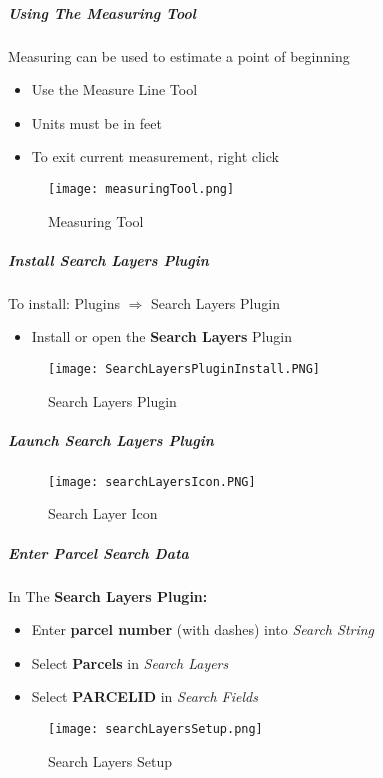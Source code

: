 \subparagraph{Using The Measuring Tool}
\vspace{.3in}

\noindent Measuring can be used to estimate a point of beginning
\begin{itemize}
\item Use the Measure Line Tool
\item Units must be in feet  
\item To exit current measurement, right click
\end{itemize}
\begin{figure}[H]
\centering
    \texttt{[image: measuringTool.png]}
\vspace{-.2in}

\caption{Measuring Tool}
\end{figure}
\clearpage

\subparagraph{Install Search Layers Plugin}
\vspace{.2in}
 
\noindent To install: Plugins $\Rightarrow$ Search Layers Plugin
\vspace{.2in}

\begin{itemize}
\item Install or open the \textbf{Search Layers} Plugin
\end{itemize}
\begin{figure}[H]
\centering
     \texttt{[image: SearchLayersPluginInstall.PNG]}

\caption{Search Layers Plugin}
\end{figure}

\subparagraph{Launch Search Layers Plugin}
\begin{figure}[H]
\centering
     \texttt{[image: searchLayersIcon.PNG]}

\caption{Search Layer Icon}
\end{figure}

\clearpage

\subparagraph*{Enter Parcel Search Data}
\vspace{.2in}

\noindent In The \textbf{Search Layers Plugin:}
\vspace{.15in}

\begin{itemize}
\item Enter \textbf{parcel number} {\tiny (with dashes)} into \emph{Search String}
\item Select \textbf{Parcels} in \emph{Search Layers}
\item Select \textbf{PARCELID} in \emph{Search Fields}
\end{itemize}
\begin{figure}[H]
\centering
    \texttt{[image: searchLayersSetup.png]}
\vspace{-.1in}

\caption{Search Layers Setup}
\end{figure}

